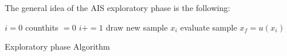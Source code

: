 \documentclass[a4paper,fleqn,usenatbib]{mnras}
\begin{document}
The general idea of the AIS exploratory phase is the following: 
\begin{algorithm}

    $i = 0 $ \;
    counthits $ = 0$ \;
      {
		$i += 1$        \; 
        draw new sample $x_i$\;
        evaluate sample $x_f = u(x_i)$ \;
      }
    \caption{Exploratory phase Algorithm}
\end{algorithm}

%
\end{document}
